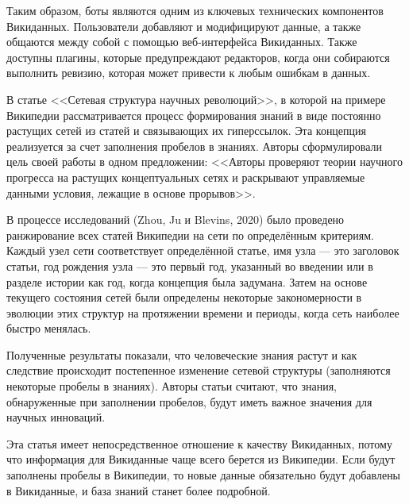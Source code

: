 Таким образом, боты являются одним из ключевых технических компонентов Викиданных. Пользователи добавляют и модифицируют данные, а также общаются между собой с помощью веб-интерфейса Викиданных. Также доступны плагины, которые предупреждают редакторов, когда они собираются выполнить ревизию, которая может привести к любым ошибкам в данных.

В статье <<Сетевая структура научных революций>>, в которой на примере Википедии рассматривается процесс формирования знаний в виде постоянно растущих сетей из статей и связывающих их гиперссылок. Эта концепция реализуется за счет заполнения пробелов в знаниях. Авторы сформулировали цель своей работы в одном предложении: <<Авторы проверяют теории научного прогресса на растущих концептуальных сетях и раскрывают управляемые данными условия, лежащие в основе прорывов>>\cite{Network_structure_revolutions}\footnotemark. 

В процессе исследований (Zhou, Ju и Blevins, 2020) было проведено ранжирование всех статей Википедии на сети по определённым критериям. Каждый узел сети соответствует определённой статье, имя узла --- это заголовок статьи, год рождения узла --- это первый год, указанный во введении или в разделе истории как год, когда концепция была задумана. Затем на основе текущего состояния сетей были определены некоторые закономерности в эволюции этих структур на протяжении времени и периоды, когда сеть наиболее быстро менялась.

Полученные результаты показали, что человеческие знания растут и как следствие происходит постепенное изменение сетевой структуры (заполняются некоторые пробелы в знаниях). Авторы статьи \cite{Network_structure_revolutions} считают, что знания, обнаруженные при заполнении пробелов, будут иметь важное значения для научных инноваций. 

Эта статья имеет непосредственное отношение к качеству Викиданных, потому что информация для Викиданные чаще всего берется из Википедии. Если будут заполнены пробелы в Википедии, то новые данные обязательно будут добавлены в Викиданные, и база знаний станет более подробной.
